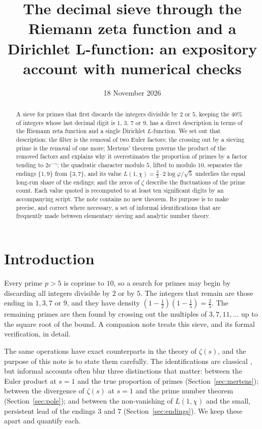 \documentclass[11pt]{amsart}
\title[The decimal sieve and the zeta function]{The decimal sieve through the Riemann zeta function and a Dirichlet L-function: an expository account with numerical checks}
\date{18 November 2026}
\theoremstyle{remark}
\begin{document}
\begin{abstract}
A sieve for primes that first discards the integers divisible by $2$ or $5$, keeping the $40\%$ of integers whose last decimal digit is $1$, $3$, $7$ or $9$, has a direct description in terms of the Riemann zeta function and a single Dirichlet $L$-function. We set out that description: the filter is the removal of two Euler factors; the crossing out by a sieving prime is the removal of one more; Mertens' theorem governs the product of the removed factors and explains why it overestimates the proportion of primes by a factor tending to $2e^{-\gamma}$; the quadratic character modulo $5$, lifted to modulo $10$, separates the endings $\{1,9\}$ from $\{3,7\}$, and its value $L(1,\chi)=\tfrac32\cdot 2\log\varphi/\sqrt5$ underlies the equal long-run share of the endings; and the zeros of $\zeta$ describe the fluctuations of the prime count. Each value quoted is recomputed to at least ten significant digits by an accompanying script. The note contains no new theorem. Its purpose is to make precise, and correct where necessary, a set of informal identifications that are frequently made between elementary sieving and analytic number theory.
\end{abstract}

\maketitle

\section{Introduction}

Every prime $p>5$ is coprime to $10$, so a search for primes may begin by discarding all integers divisible by $2$ or by $5$. The integers that remain are those ending in $1,3,7$ or $9$, and they have density $(1-\tfrac12)(1-\tfrac15)=\tfrac25$. The remaining primes are then found by crossing out the multiples of $3,7,11,\dots$ up to the square root of the bound. A companion note treats this sieve, and its formal verification, in detail.

The same operations have exact counterparts in the theory of $\zeta(s)$, and the purpose of this note is to state them carefully. The identifications are classical \cite{HardyWright2008,Apostol1976,Davenport1980}, but informal accounts often blur three distinctions that matter: between the Euler product at $s=1$ and the true proportion of primes (Section~\ref{sec:mertens}); between the divergence of $\zeta(s)$ at $s=1$ and the prime number theorem (Section~\ref{sec:pole}); and between the non-vanishing of $L(1,\chi)$ and the small, persistent lead of the endings $3$ and $7$ (Section~\ref{sec:endings}). We keep these apart and quantify each.
\end{document}
